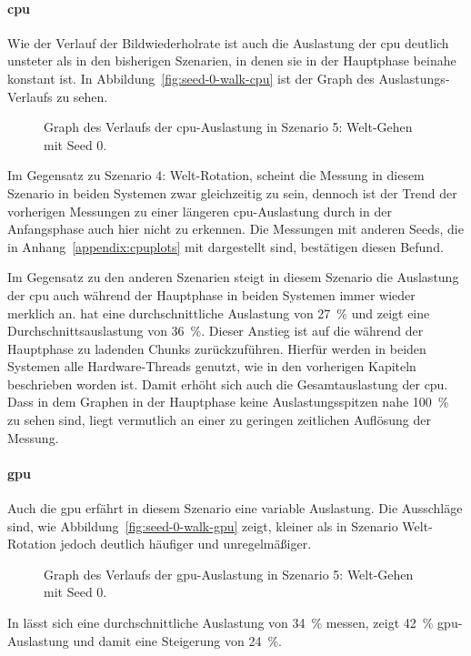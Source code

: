 \paragraph{\ac{cpu}}
Wie der Verlauf der Bildwiederholrate ist auch die Auslastung der \ac{cpu} deutlich unsteter als in den bisherigen Szenarien, in denen sie in der Hauptphase beinahe konstant ist. In Abbildung~\vref{fig:seed-0-walk-cpu} ist der Graph des Auslastungs-Verlaufs zu sehen.
\begin{figure}[!htbp]
	\caption[Graph des Verlaufs der -Auslastung in Szenario 5: Welt-Gehen mit Seed 0.]{Graph des Verlaufs der \ac{cpu}-Auslastung in Szenario 5: Welt-Gehen mit Seed 0.}\label{fig:seed-0-walk-cpu}
\end{figure}
Im Gegensatz zu Szenario 4: Welt-Rotation, scheint die Messung in diesem Szenario in beiden Systemen zwar gleichzeitig zu sein, dennoch ist der Trend der vorherigen Messungen zu einer längeren \ac{cpu}-Auslastung durch \sysB{} in der Anfangsphase auch hier nicht zu erkennen. Die Messungen mit anderen Seeds, die in Anhang~\vref{appendix:cpuplots} mit dargestellt sind, bestätigen diesen Befund.

Im Gegensatz zu den anderen Szenarien steigt in diesem Szenario die Auslastung der \ac{cpu} auch während der Hauptphase in beiden Systemen immer wieder merklich an. \sysA{} hat eine durchschnittliche Auslastung von \SI{27}{\percent} und \sysB{} zeigt eine Durchschnittsauslastung von \SI{36}{\percent}. Dieser Anstieg ist auf die während der Hauptphase zu ladenden Chunks zurückzuführen. Hierfür werden in beiden Systemen alle Hardware-Threads genutzt, wie in den vorherigen Kapiteln beschrieben worden ist. Damit erhöht sich auch die Gesamtauslastung der \ac{cpu}. Dass in dem Graphen in der Hauptphase keine Auslastungsspitzen nahe \SI{100}{\percent} zu sehen sind, liegt vermutlich an einer zu geringen zeitlichen Auflösung der Messung.

\paragraph{\ac{gpu}}
Auch die \ac{gpu} erfährt in diesem Szenario eine variable Auslastung. Die Ausschläge sind, wie Abbildung~\vref{fig:seed-0-walk-gpu} zeigt, kleiner als in Szenario Welt-Rotation jedoch deutlich häufiger und unregelmäßiger.
\begin{figure}[!htbp]
	\caption[Graph des Verlaufs der -Auslastung in Szenario 5: Welt-Gehen mit Seed 0.]{Graph des Verlaufs der \ac{gpu}-Auslastung in Szenario 5: Welt-Gehen mit Seed 0.}\label{fig:seed-0-walk-gpu}
\end{figure}
In \sysA{} lässt sich eine durchschnittliche Auslastung von \SI{34}{\percent} messen, \sysB{} zeigt \SI{42}{\percent} \ac{gpu}-Auslastung und damit eine Steigerung von \SI{24}{\percent}.


